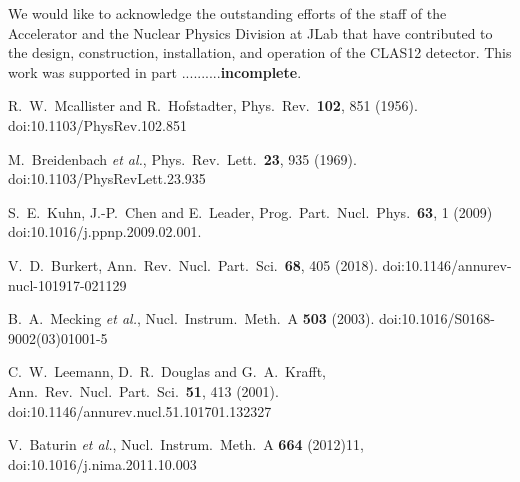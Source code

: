 \documentclass[final,3p,times,twocolumn,authoryear]{elsarticle}
\begin{document}
\vspace{0.5cm}


\vspace{0.3cm}

We would like to acknowledge the outstanding efforts of the staff of the Accelerator and the Nuclear Physics Division at JLab
that have contributed to the design, construction, installation, and operation of the CLAS12 detector.  This work was supported
in part ..........{\bf incomplete}.

\vspace{2.5cm}



\begin{thebibliography}{99}

  R.~W.~Mcallister and R.~Hofstadter,
  Phys.\ Rev.\  {\bf 102}, 851 (1956).
  doi:10.1103/PhysRev.102.851

  M.~Breidenbach {\it et al.},
  Phys.\ Rev.\ Lett.\  {\bf 23}, 935 (1969).
  doi:10.1103/PhysRevLett.23.935
  
  S.~E.~Kuhn, J.-P.~Chen and E.~Leader,
  Prog.\ Part.\ Nucl.\ Phys.\  {\bf 63}, 1 (2009)
  doi:10.1016/j.ppnp.2009.02.001.
 
  V.~D.~Burkert,
  Ann.\ Rev.\ Nucl.\ Part.\ Sci.\  {\bf 68}, 405 (2018).
  doi:10.1146/annurev-nucl-101917-021129 
  
  B.~A.~Mecking {\it et al.},
  Nucl.\ Instrum.\ Meth.\ A {\bf 503} (2003).
  doi:10.1016/S0168-9002(03)01001-5

  C.~W.~Leemann, D.~R.~Douglas and G.~A.~Krafft,
  Ann.\ Rev.\ Nucl.\ Part.\ Sci.\  {\bf 51}, 413 (2001).
  doi:10.1146/annurev.nucl.51.101701.132327

  V.~Baturin {\it et al.},
  Nucl.\ Instrum.\ Meth.\ A {\bf 664} (2012)11, doi:10.1016/j.nima.2011.10.003


\end{thebibliography}
\end{document}
